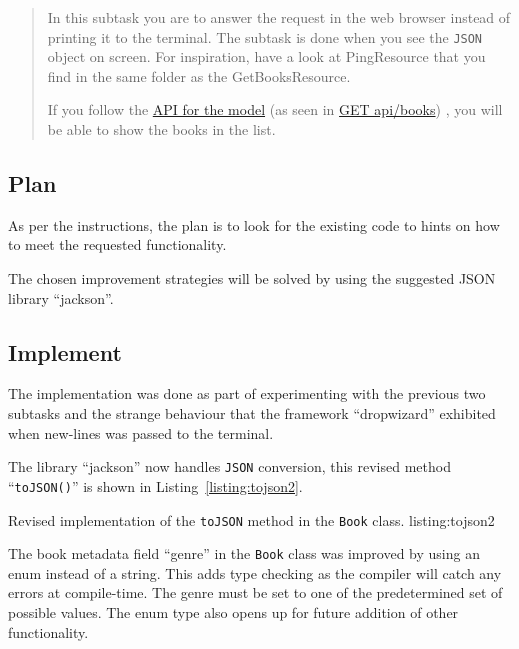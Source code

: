 \begin{quote}
  In this subtask you are to answer the request in the web browser instead of
  printing it to the terminal. The subtask is done when you see the \texttt{JSON} object
  on screen. For inspiration, have a look at PingResource that you find in the
  same folder as the GetBooksResource. 

  If you follow the 
  \href{https://htmlpreview.github.io/?https://github.com/tobias-dv-lnu/1dv600-lab/blob/master/api-specification/api-specification.html}{API for the model}
  (as seen in 
  \href{https://htmlpreview.github.io/?https://github.com/tobias-dv-lnu/1dv600-lab/blob/master/api-specification/api-specification.html\#books-get}{GET api/books})
  , you will be able to show the books in the list.
\end{quote}


\subsection{Plan}\label{task-1c-plan}
As per the instructions, the plan is to look for the existing code to hints
on how to meet the requested functionality.

The chosen improvement strategies will be solved by using the suggested JSON
library ``jackson''\cite{jackson-json}.

\subsection{Implement}\label{task-1c-implement}
The implementation was done as part of experimenting with the previous two
subtasks and the strange behaviour that the framework ``dropwizard'' exhibited
when new-lines was passed to the terminal.

The library ``jackson'' now handles \texttt{JSON} conversion,  this revised
method ``\texttt{toJSON()}'' is shown in Listing~\ref{listing:tojson2}.

           {Revised implementation of the \texttt{toJSON\(\)} method in the
            \texttt{Book} class.}
           {listing:tojson2}

The book metadata field ``genre'' in the \texttt{Book} class was improved by
using an enum instead of a string. This adds type checking as the compiler will
catch any errors at compile-time. The genre must be set to one of the
predetermined set of possible values. The enum type also opens up for future
addition of other functionality.


